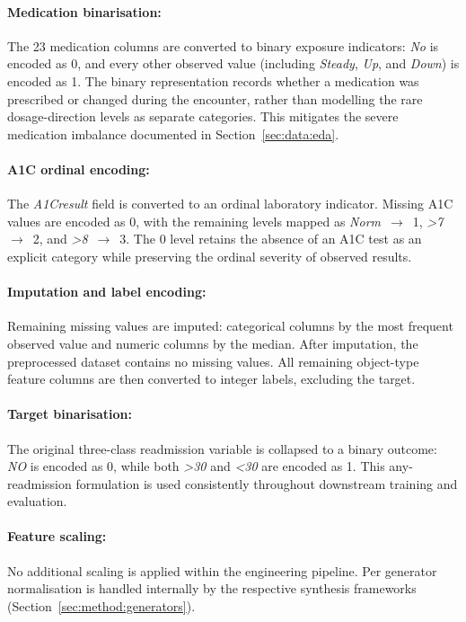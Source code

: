 \paragraph{Medication binarisation:}
The 23 medication columns are converted to binary exposure indicators: \emph{No} is encoded as 0, and
every other observed value (including \emph{Steady}, \emph{Up}, and
\emph{Down}) is encoded as 1. The binary representation records whether
a medication was prescribed or changed during the encounter, rather than
modelling the rare dosage-direction levels as separate categories. This
mitigates the severe medication imbalance documented in
Section~\ref{sec:data:eda}.

\paragraph{A1C ordinal encoding:}
The \emph{A1Cresult} field is converted to an ordinal laboratory
indicator. Missing A1C values are encoded as
0, with the remaining levels mapped as \emph{Norm}~$\rightarrow$~1,
\emph{>7}~$\rightarrow$~2, and \emph{>8}~$\rightarrow$~3. The 0 level
retains the absence of an A1C test as an explicit category while
preserving the ordinal severity of observed results.

\paragraph{Imputation and label encoding:}
Remaining missing values are imputed: categorical
columns by the most frequent observed value and numeric columns by the
median. After imputation, the
preprocessed dataset contains no missing values. All remaining
object-type feature columns are then converted to integer labels,
excluding the target.

\paragraph{Target binarisation:}
The original three-class readmission variable is collapsed to a binary
outcome: \emph{NO} is encoded as 0, while both
\emph{>30} and \emph{<30} are encoded as 1. This any-readmission
formulation is used consistently throughout downstream training and
evaluation.

\paragraph{Feature scaling:}
No additional scaling is applied within the engineering pipeline.
Per generator normalisation is handled internally by the respective
synthesis frameworks
(Section~\ref{sec:method:generators}).

